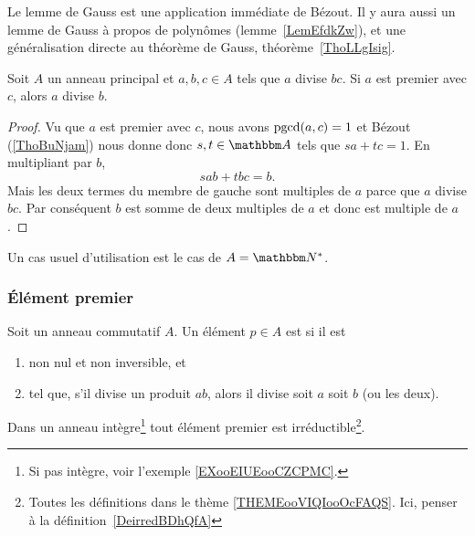 Le lemme de Gauss est une application immédiate de Bézout. Il y aura aussi un lemme de Gauss à propos de polynômes (lemme~\ref{LemEfdkZw}), et une généralisation directe au théorème de Gauss, théorème~\ref{ThoLLgIsig}.
\begin{lemma}    \label{LemSdnZNX}
    Soit \( A\) un anneau principal et \( a,b,c\in A\) tels que \( a\) divise \( bc\). Si \( a\) est premier avec \( c\), alors \( a\) divise \( b\).
\end{lemma}

\begin{proof}
    Vu que \( a\) est premier avec \( c\), nous avons \( \operatorname{pgcd}(a,c)=1\) et Bézout (\ref{ThoBuNjam}) nous donne donc \( s,t\in \eA\) tels que \( sa+tc=1\). En multipliant par \( b\),
    \begin{equation}
        sab+tbc=b.
    \end{equation}
    Mais les deux termes du membre de gauche sont multiples de \( a\) parce que \( a\) divise \( bc\). Par conséquent \( b\) est somme de deux multiples de \( a\) et donc est multiple de \( a\).
\end{proof}
Un cas usuel d'utilisation est le cas de \( A=\eN^*\).

\subsubsection{Élément premier}

\begin{definition}       \label{DEFooZCRQooWXRalw}
    Soit un anneau commutatif \( A\). Un élément \( p\in A\) est  si il est
    \begin{enumerate}
        \item
            non nul et non inversible, et
        \item       \label{ITEMooPMTTooCVHPIm}
            tel que, s'il divise un produit \( ab\), alors il divise soit \( a\) soit \( b\) (ou les deux).
    \end{enumerate}
\end{definition}

\begin{proposition}     \label{PROPooWMNPooZdvOBt}
    Dans un anneau intègre\footnote{Si pas intègre, voir l'exemple \ref{EXooEIUEooCZCPMC}.} tout élément premier est irréductible\footnote{Toutes les définitions dans le thème \ref{THEMEooVIQIooOcFAQS}. Ici, penser à la définition~\ref{DeirredBDhQfA}}.
\end{proposition}
    
